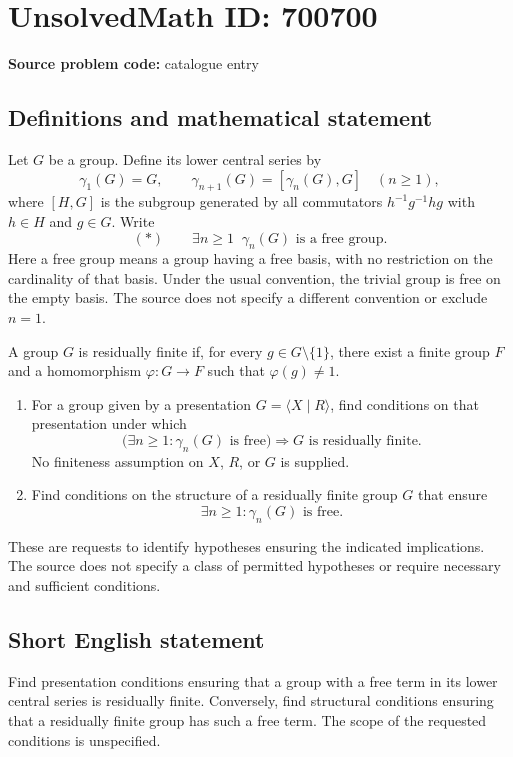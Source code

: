 \documentclass[11pt]{article}
\begin{document}
\section*{UnsolvedMath ID: 700700}
\textbf{Source problem code:} catalogue entry
\subsection{Definitions and mathematical statement}
Let \(G\) be a group. Define its lower central series by
\[
\gamma_1(G)=G,\qquad \gamma_{n+1}(G)=[\gamma_n(G),G]\quad(n\geq 1),
\]
where \([H,G]\) is the subgroup generated by all commutators \(h^{-1}g^{-1}hg\) with \(h\in H\) and \(g\in G\). Write
\[
(*)\qquad \exists n\geq 1\;\;\gamma_n(G)\text{ is a free group}.
\]
Here a free group means a group having a free basis, with no restriction on the cardinality of that basis. Under the usual convention, the trivial group is free on the empty basis. The source does not specify a different convention or exclude \(n=1\).

A group \(G\) is residually finite if, for every \(g\in G\setminus\{1\}\), there exist a finite group \(F\) and a homomorphism \(\varphi:G\to F\) such that \(\varphi(g)\neq 1\).

\begin{enumerate}
\item[(a)] For a group given by a presentation \(G=\langle X\mid R\rangle\), find conditions on that presentation under which
\[
\bigl(\exists n\geq 1:\gamma_n(G)\text{ is free}\bigr)
\Longrightarrow G\text{ is residually finite}.
\]
No finiteness assumption on \(X\), \(R\), or \(G\) is supplied.
\item[(b)] Find conditions on the structure of a residually finite group \(G\) that ensure
\[
\exists n\geq 1:\gamma_n(G)\text{ is free}.
\]
\end{enumerate}
These are requests to identify hypotheses ensuring the indicated implications. The source does not specify a class of permitted hypotheses or require necessary and sufficient conditions.
\subsection{Short English statement}
Find presentation conditions ensuring that a group with a free term in its lower central series is residually finite. Conversely, find structural conditions ensuring that a residually finite group has such a free term. The scope of the requested conditions is unspecified.
\end{document}
